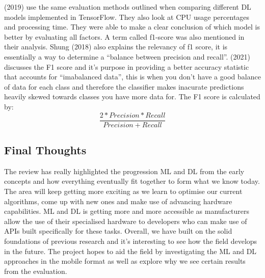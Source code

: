 \documentclass{article}
\begin{document}
\citeauthor{Chockwanich} (2019) use the same evaluation methods outlined when comparing different DL models 
implemented in TensorFlow. They also look at CPU usage percentages and processing time. They were able to make a clear 
conclusion of which model is better by evaluating all factors. A term called f1-score was also mentioned in their 
analysis. Shung (2018) also explains the relevancy of f1 score, it is essentially a way to determine a “balance between
precision and recall”. \citeauthor{kors2021} (2021) discusses the F1 score and it's purpose in providing a better 
accuracy statistic that accounts for “imabalanced data”, this is when you don't have a good balance of data for each 
class and therefore the classifier makes inacurate predictions heavily skewed towards classes you have more data for. 
The F1 score is calculated by:
\[\frac{2*Precision*Recall}{Precision + Recall}\]

\subsection{Final Thoughts}

The review has really highlighted the progression ML and DL from the early concepts and how everything eventually fit 
together to form what we know today. The area will keep getting more exciting as we learn to optimise our current 
algorithms, come up with new ones and make use of advancing hardware capabilities. ML and DL is getting more and more 
accessible as manufacturers allow the use of their specialised hardware to developers who can make use of APIs built 
specifically for these tasks. Overall, we have built on the solid foundations of previous research and it's interesting 
to see how the field develops in the future. The project hopes to aid the field by investigating the ML and DL 
approaches in the mobile format as well as explore why we see certain results from the evaluation.

\clearpage
\printbibliography
\end{document}
